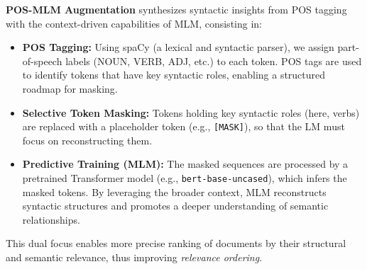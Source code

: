 \textbf{POS-MLM Augmentation} synthesizes syntactic insights from POS tagging with the context-driven capabilities of MLM, consisting in:
\begin{itemize}
    \item \textbf{POS Tagging:} Using spaCy (a lexical and syntactic parser), we assign part-of-speech labels (NOUN, VERB, ADJ, etc.) to each token. POS tags are used to identify tokens that have key syntactic roles, enabling a structured roadmap for masking.
    \item \textbf{Selective Token Masking:} Tokens holding key syntactic roles (here, verbs) are replaced with a placeholder token (e.g., \texttt{[MASK]}), so that the LM must focus on reconstructing them.
    \item \textbf{Predictive Training (MLM):} The masked sequences are processed by a pretrained Transformer model (e.g., \texttt{bert-base-uncased}), which infers the masked tokens. By leveraging the broader context, MLM reconstructs syntactic structures and promotes a deeper understanding of semantic relationships.
\end{itemize}

This dual focus enables more precise ranking of documents by their structural and semantic relevance, thus improving \textit{relevance ordering}.

